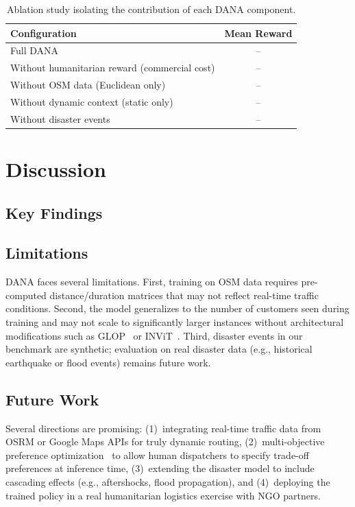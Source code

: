 \documentclass[12pt,a4paper]{article}
\begin{document}
\begin{table}[ht]
	\centering
	\begin{tabular}{lc}
		\toprule
		Configuration                                 & Mean Reward \\
		\midrule
		Full DANA                                     & --          \\
		Without humanitarian reward (commercial cost) & --          \\
		Without OSM data (Euclidean only)             & --          \\
		Without dynamic context (static only)         & --          \\
		Without disaster events                       & --          \\
		\bottomrule
	\end{tabular}
	\caption{Ablation study isolating the contribution of each DANA component.}
	\label{tab:ablation}
\end{table}

\section{Discussion}

\subsection{Key Findings}

\subsection{Limitations}

DANA faces several limitations. First, training on OSM data requires
pre-computed distance/duration matrices that may not reflect real-time traffic
conditions. Second, the model generalizes to the number of customers seen
during training and may not scale to significantly larger instances without
architectural modifications such as GLOP~\cite{glop2024} or
INViT~\cite{invit2024}. Third, disaster events in our benchmark are synthetic;
evaluation on real disaster data (e.g., historical earthquake or flood events)
remains future work.

\subsection{Future Work}

Several directions are promising: (1)~integrating real-time traffic data from
OSRM or Google Maps APIs for truly dynamic routing, (2)~multi-objective
preference optimization~\cite{preference2025} to allow human dispatchers to
specify trade-off preferences at inference time, (3)~extending the disaster
model to include cascading effects (e.g., aftershocks, flood propagation), and
(4)~deploying the trained policy in a real humanitarian logistics exercise with
NGO partners.
\end{document}
